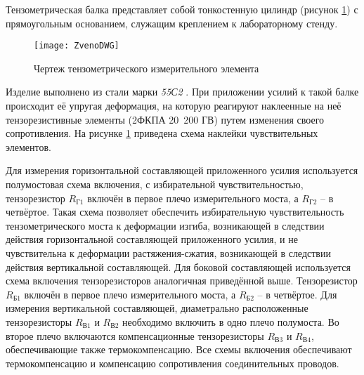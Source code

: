 Тензометрическая балка представляет собой тонкостенную цилиндр (рисунок \ref{fig:Zveno}) с прямоугольным основанием, служащим креплением к лабораторному стенду.%
%
\begin{figure}[!h]
	\centering
	\texttt{[image: ZvenoDWG]}
	\caption{Чертеж тензометрического измерительного элемента} 
	\label{fig:Zveno}  
\end{figure}
Изделие выполнено из стали марки \textit{55С2} \cite{Feshenko2017spravochik}. При приложении усилий к такой балке происходит её упругая деформация, на которую реагируют наклеенные на неё тензорезистивные элементы (2ФКПА 20~200 ГВ) путем изменения своего сопротивления. На рисунке \ref{fig:Zveno} приведена схема наклейки чувствительных элементов.

Для измерения горизонтальной составляющей приложенного усилия используется полумостовая схема включения, с избирательной чувствительностью, тензорезистор $R_\textit{Г1}$ включён в первое плечо измерительного моста, а $R_\textit{Г2}$ – в четвёртое. Такая схема позволяет обеспечить избирательную чувствительность тензометрического моста к деформации изгиба, возникающей в следствии действия горизонтальной составляющей приложенного усилия, и не чувствительна к деформации растяжения-сжатия, возникающей в следствии действия вертикальной составляющей. Для боковой составляющей используется схема включения тензорезисторов аналогичная приведённой выше. Тензорезистор $R_\textit{Б1}$ включён в первое плечо измерительного моста, а $R_\textit{Б2}$ – в четвёртое. Для измерения вертикальной составляющей, диаметрально расположенные тензорезисторы $R_\textit{В1}$ и $R_\textit{В2}$ необходимо включить в одно плечо полумоста. Во второе плечо включаются компенсационные тензорезисторы $R_\textit{В3}$ и $R_\textit{В4}$, обеспечивающие также термокомпенсацию. Все схемы включения обеспечивают термокомпенсацию и компенсацию сопротивления соединительных проводов.

